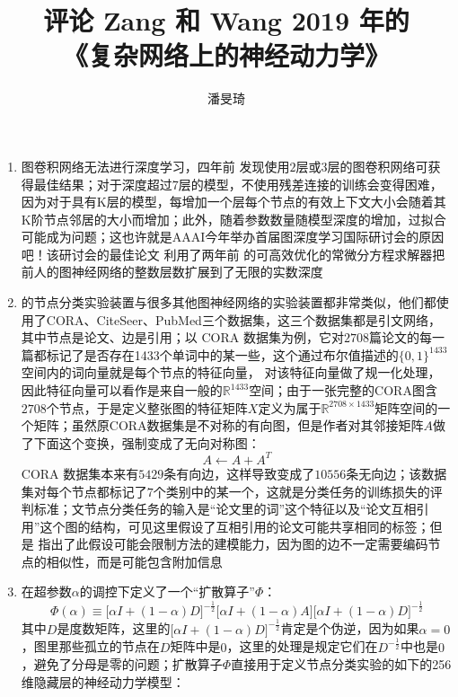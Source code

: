 \documentclass[11pt]{article}
\title{评论 Zang 和 Wang 2019 年的\\《复杂网络上的神经动力学》}
\author{潘旻琦}
\date{\zhtoday}
\begin{document}
\maketitle

\begin{enumerate}
\item 图卷积网络无法进行深度学习，四年前 \cite{DBLP:journals/corr/KipfW16} 发现使用$2$层或$3$层的图卷积网络可获得最佳结果；对于深度超过7层的模型，不使用残差连接的训练会变得困难，因为对于具有K层的模型，每增加一个层每个节点的有效上下文大小会随着其K阶节点邻居的大小而增加；此外，随着参数数量随模型深度的增加，过拟合可能成为问题；这也许就是AAAI今年举办首届图深度学习国际研讨会的原因吧！该研讨会的最佳论文 \cite{zang2019neural} 利用了两年前 \cite{DBLP:journals/corr/abs-1806-07366} 的可高效优化的常微分方程求解器把前人的图神经网络的整数层数扩展到了无限的实数深度
\item \cite{zang2019neural} 的节点分类实验装置与很多其他图神经网络的实验装置都非常类似，他们都使用了CORA、CiteSeer、PubMed三个数据集，这三个数据集都是引文网络，其中节点是论文、边是引用；以 CORA 数据集为例，它对$2708$篇论文的每一篇都标记了是否存在1433个单词中的某一些，这个通过布尔值描述的$\{0,1\}^{1433}$空间内的词向量就是每个节点的特征向量，\cite{zang2019neural} 对该特征向量做了规一化处理，因此特征向量可以看作是来自一般的$\mathbb{R}^{1433}$空间；由于一张完整的CORA图含$2708$个节点，于是定义整张图的特征矩阵$X$定义为属于$\mathbb{R}^{2708\times1433}$矩阵空间的一个矩阵；虽然原CORA数据集是不对称的有向图，但是作者对其邻接矩阵$A$做了下面这个变换，强制变成了无向对称图：\[
A\leftarrow A+A^T
\]CORA 数据集本来有$5429$条有向边，这样导致变成了$10556$条无向边；该数据集对每个节点都标记了$7$个类别中的某一个，这就是分类任务的训练损失的评判标准；文节点分类任务的输入是``论文里的词''这个特征以及``论文互相引用''这个图的结构，可见这里假设了互相引用的论文可能共享相同的标签；但是 \cite{DBLP:journals/corr/KipfW16} 指出了此假设可能会限制方法的建模能力，因为图的边不一定需要编码节点的相似性，而是可能包含附加信息
\item \cite{zang2019neural}在超参数$\alpha$的调控下定义了一个``扩散算子''$\Phi$：\[
\Phi(\alpha)\equiv\big[\alpha I  + (1-\alpha)D\big]^{-\frac{1}{2}}\big[\alpha I +  (1-\alpha)A\big]\big[\alpha I  + (1-\alpha)D\big]^{-\frac{1}{2}}
\]其中$D$是度数矩阵，这里的$\big[\alpha I  + (1-\alpha)D\big]^{-\frac{1}{2}}$肯定是个伪逆，因为如果$\alpha=0$，图里那些孤立的节点在$D$矩阵中是$0$，这里的处理是规定它们在$D^{-\frac{1}{2}}$中也是$0$，避免了分母是零的问题；扩散算子$\Phi$直接用于定义节点分类实验的如下的256维隐藏层的神经动力学模型：\[
\begin{split}

\end{split}\]
\end{enumerate}
\end{document}
